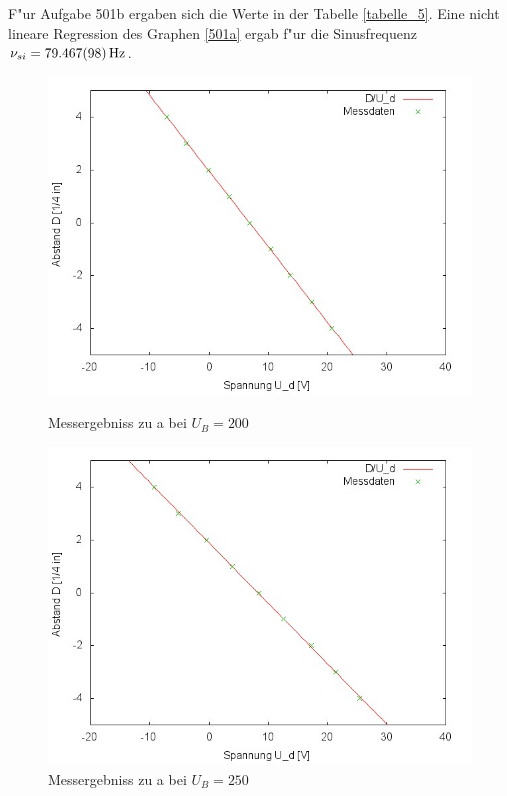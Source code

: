 		F"ur Aufgabe 501b ergaben sich die Werte in der Tabelle \ref{tabelle_5}. Eine nicht lineare Regression des Graphen \ref{501a} ergab f"ur die Sinusfrequenz $\nu_{si} = \SI{79.467 (98)}{\hertz}$.
		\newpage

		
		

		\begin{figure}[htbp]
			\centering
			\includegraphics[width = 12cm]{img/501a200.jpg}
			\caption{Messergebniss zu a bei $U_B = 200$}
			\label{501a200}
		
			\centering
			\includegraphics[width = 12cm]{img/501a250.jpg}
			\caption{Messergebniss zu a bei $U_B = 250$}
			\label{501a250}
		\end{figure}

